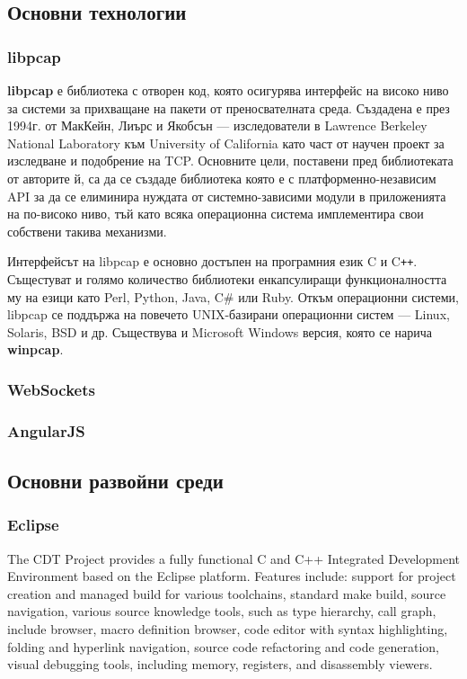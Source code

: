 \documentclass[12pt,a4paper,oneside]{book}
\begin{document}
\subsection{Основни технологии}

\subsubsection{libpcap}

\textbf{libpcap} е библиотека с отворен код, която осигурява интерфейс на високо
ниво за системи за прихващане на пакети от преносвателната среда. Създадена е
през 1994г. от МакКейн, Лиърс и Якобсън --- изследователи в Lawrence Berkeley
National Laboratory към University of California като част от научен проект за
изследване и подобрение на TCP.  Основните цели, поставени пред библиотеката от
авторите й, са да се създаде
библиотека която е с платформенно-независим API за да се елиминира нуждата от
системно-зависими модули в приложенията на по-високо ниво, тъй като всяка
операционна система имплементира свои собствени такива механизми.

Интерфейсът на libpcap е основно достъпен на програмния език C и C\texttt{++}.
Същестуват и голямо количество библиотеки енкапсулиращи функционалността му на
езици като Perl, Python, Java, C# или Ruby. Откъм операционни системи,
libpcap се поддържа на повечето UNIX-базирани операционни систем --- 
Linux, Solaris, BSD и др. Съществува и Microsoft Windows версия, която се
нарича \textbf{winpcap}.


\subsubsection{WebSockets}

\subsubsection{AngularJS}

\subsection{Основни развойни среди}
\subsubsection{Eclipse}

The CDT Project provides a fully functional C and C++ Integrated Development
Environment based on the Eclipse platform. Features include: support for project
creation and managed build for various toolchains, standard make build, source
navigation, various source knowledge tools, such as type hierarchy, call graph,
include browser, macro definition browser, code editor with syntax highlighting,
folding and hyperlink navigation, source code refactoring and code generation,
visual debugging tools, including memory, registers, and disassembly viewers.
\end{document}
